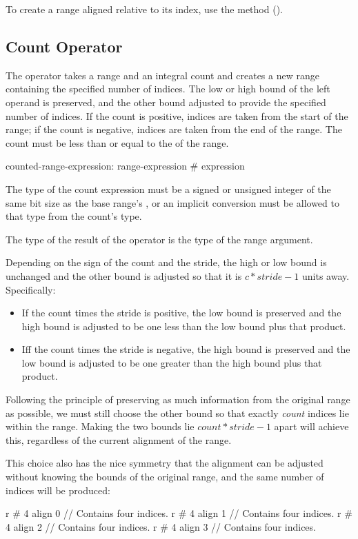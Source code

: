 To create a range aligned relative to its  index, use
the  method ().


\subsection{Count Operator}
\label{Count_Operator}

The \chpl{#} operator takes a range and an integral count and creates a new
range containing the specified number of indices.  The low or high bound of the
left operand is preserved, and the other bound adjusted to provide the specified
number of indices.  If the count is positive, indices are taken from the start
of the range; if the count is negative, indices are taken from the end of the
range.  The count must be less than or equal to the  of the range.

\begin{syntax}
counted-range-expression:
  range-expression # expression
\end{syntax}

The type of the count expression must be a signed or unsigned integer
of the same bit size as the base range's , or an
implicit conversion must be allowed to that type from the count's
type.

The type of the result of the \chpl{#} operator is the type of the
range argument.

Depending on the sign of the count and the stride, the high or low bound is
unchanged and the other bound is adjusted so that it is $c * stride - 1$ units
away.  Specifically:
\begin{itemize}
\item If the count times the stride is positive, the low bound is preserved
and the high bound is adjusted to be one less than the low bound plus that
product.
\item Iff the count times the stride is negative, the high bound is preserved
and the low bound is adjusted to be one greater than the high bound plus that
product.
\end{itemize}

\begin{rationale}
Following the principle of preserving as much information from the original
range as possible, we must still choose the other bound so that
exactly \emph{count} indices lie within the range.  Making the two bounds lie
$count * stride - 1$ apart will achieve this, regardless of the current
alignment of the range.

This choice also has the nice symmetry that the alignment can be adjusted
without knowing the bounds of the original range, and the same number of indices
will be produced:
\begin{chapel}
r # 4 align 0   // Contains four indices.
r # 4 align 1   // Contains four indices.
r # 4 align 2   // Contains four indices.
r # 4 align 3   // Contains four indices.
\end{chapel}
\end{rationale}

